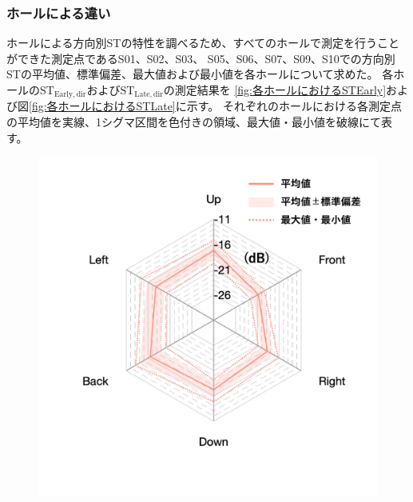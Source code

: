 \documentclass[11pt,a4j]{jreport}
\begin{document}
    \subsubsection{ホールによる違い}

    ホールによる方向別STの特性を調べるため、すべてのホールで測定を行うことができた測定点であるS01、S02、S03、
    S05、S06、S07、S09、S10での方向別STの平均値、標準偏差、最大値および最小値を各ホールについて求めた。
    各ホールの$\mathrm{ST_{Early,dir}}$および$\mathrm{ST_{Late,dir}}$の測定結果を
    \ref{fig:各ホールにおけるSTEarly}および図\ref{fig:各ホールにおけるSTLate}に示す。
    それぞれのホールにおける各測定点の平均値を実線、1シグマ区間を色付きの領域、最大値・最小値を破線にて表す。

    \begin{figure}[H]
      \begin{minipage}[b]{.33\textwidth}
          \centering
          \includegraphics[width=1\linewidth]{images/realHallDirSt/early_hall_a_withLegend.png}
          \label{fig:ホールAにおけるSTEarly}
      \end{minipage}%
      \begin{minipage}[b]{.33\textwidth}
        \centering

\end{minipage}
\end{figure}
\end{document}
